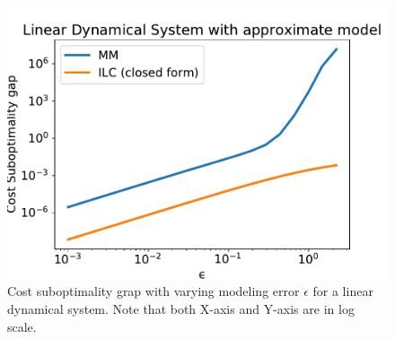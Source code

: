 \begin{figure}[t]
  \centering
  \includegraphics[width=0.5\linewidth]{figures/ilc/lds.pdf}
  \caption{Cost suboptimality grap with varying modeling error
    $\epsilon$ for a linear dynamical system. Note that both X-axis
    and Y-axis are in log scale.}
  \label{fig:lds}
\end{figure}

